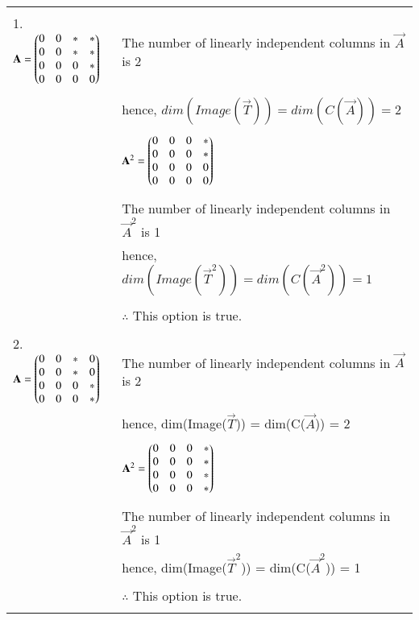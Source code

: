 \documentclass[journal,12pt]{IEEEtran}
\begin{document}
\begin{longtable}{|l|l|}
    \hline
        & \\
        1. $\mathbf{A} = \begin{pmatrix}0 & 0 & * & * \\ 0 & 0 & * & * \\ 0 & 0 & 0 & * \\ 0 & 0 & 0 & 0\end{pmatrix}$ & The number of linearly independent columns in $\vec{A}$ is 2\\
    \hline
        & \\
        & hence, $dim(Image(\vec{T})) = dim(C(\vec{A})) = 2$\\
        & \\
        & $\mathbf{A}^2 = \begin{pmatrix}0 & 0 & 0 & * \\ 0 & 0 & 0 & * \\ 0 & 0 & 0 & 0 \\ 0 & 0 & 0 & 0\end{pmatrix}$\\
        & \\
        & The number of linearly independent columns in $\vec{A}^2$ is 1\\
        & hence, $dim(Image(\vec{T}^2)) = dim(C(\vec{A}^2)) = 1$\\
        & \\
        & $\therefore$ This option is true.\\
    \hline
        & \\
        2. $\mathbf{A} = \begin{pmatrix}0 & 0 & * & 0 \\ 0 & 0 & * & 0 \\ 0 & 0 & 0 & * \\ 0 & 0 & 0 & *\end{pmatrix}$ & The number of linearly independent columns in $\vec{A}$ is 2\\
        & hence, dim(Image($\vec{T}$)) = dim(C($\vec{A}$)) = 2\\
        & \\
        & $\mathbf{A}^2 = \begin{pmatrix}0 & 0 & 0 & * \\ 0 & 0 & 0 & * \\ 0 & 0 & 0 & * \\ 0 & 0 & 0 & *\end{pmatrix}$\\
        & \\
        & The number of linearly independent columns in $\vec{A}^2$ is 1\\
        & hence, dim(Image($\vec{T}^2$)) = dim(C($\vec{A}^2$)) = 1\\
        & \\
        & $\therefore$ This option is true.\\
    \hline
        & \\

\end{longtable}
\end{document}
